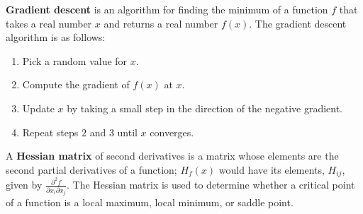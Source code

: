 \begin{definition}
    \textbf{Gradient descent} is an algorithm for finding the minimum of a function $f$ that takes a real number $x$ and returns a real number $f(x)$. The gradient descent algorithm is as follows:
    \begin{enumerate}
        \item Pick a random value for $x$.
        \item Compute the gradient of $f(x)$ at $x$.
        \item Update $x$ by taking a small step in the direction of the negative gradient.
        \item Repeat steps $2$ and $3$ until $x$ converges.
    \end{enumerate}
\end{definition}

\begin{definition}
    A \textbf{Hessian matrix} of second derivatives is a matrix whose elements are the second partial derivatives of a function; $H_{f}(x)$ would have its elements, $H_{ij}$, given by $\frac{\partial^{2} f}{\partial x_{i} \partial x_{j}}$. The Hessian matrix is used to determine whether a critical point of a function is a local maximum, local minimum, or saddle point.
\end{definition}


